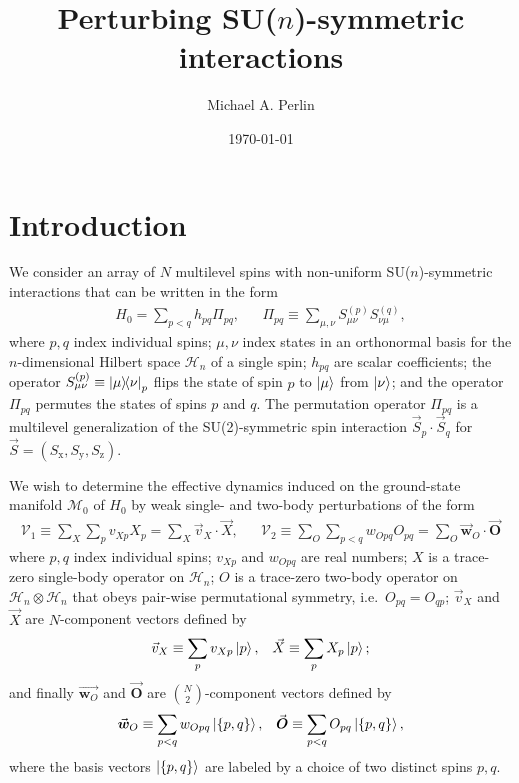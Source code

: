 \documentclass[nofootinbib,notitlepage,11pt]{revtex4-2}
\newcommand{\p}[1]{\left(#1\right)} %
\renewcommand{\set}[1]{\left\{#1\right\}} %
\renewcommand{\c}{\cdot} %
\newcommand{\m}{\bm} %
\renewcommand{\v}{\vec} %
\newcommand{\1}{\mathds{1}}
\newcommand{\x}{\text{x}}
\newcommand{\y}{\text{y}}
\newcommand{\z}{\text{z}}
\renewcommand{\H}{\mathcal{H}}
\newcommand{\M}{\mathcal{M}}
\newcommand{\V}{\mathcal{V}}
\begin{document}
\title{Perturbing SU($n$)-symmetric interactions}%
\author{Michael A. Perlin}%
\date{\today}

\maketitle

\tableofcontents

\section{Introduction}

We consider an array of $N$ multilevel spins with non-uniform
SU($n$)-symmetric interactions that can be written in the form
\begin{align}
  H_0 = \sum_{p<q} h_{pq} \Pi_{pq},
  &&
  \Pi_{pq} \equiv \sum_{\mu,\nu} S_{\mu\nu}^{(p)} S_{\nu\mu}^{(q)},
  \label{eq:ints}
\end{align}
where $p,q$ index individual spins; $\mu,\nu$ index states in an
orthonormal basis for the $n$-dimensional Hilbert space $\H_n$ of a
single spin; $h_{pq}$ are scalar coefficients; the operator
$S_{\mu\nu}^{(p)}\equiv\op{\mu}{\nu}_p$ flips the state of spin $p$ to
$\ket\mu$ from $\ket\nu$; and the operator $\Pi_{pq}$ permutes the
states of spins $p$ and $q$.  The permutation operator $\Pi_{pq}$ is a
multilevel generalization of the SU(2)-symmetric spin interaction
$\v S_p\c\v S_q$ for $\v S=\p{S_\x,S_\y,S_\z}$.

We wish to determine the effective dynamics induced on the
ground-state manifold $\M_0$ of $H_0$ by weak single- and two-body
perturbations of the form
\begin{align}
  \V_1 \equiv \sum_X \sum_p v_{Xp} X_p = \sum_X \v v_X\c\v X,
  &&
  \V_2 \equiv \sum_O \sum_{p<q} w_{Opq} O_{pq}
  = \sum_O \v{\m w}_O\c \v{\m O}
  \label{eq:perturbations}
\end{align}
where $p,q$ index individual spins; $v_{Xp}$ and $w_{Opq}$ are real
numbers; $X$ is a trace-zero single-body operator on $\H_n$; $O$ is a
trace-zero two-body operator on $\H_n\otimes\H_n$ that obeys pair-wise
permutational symmetry, i.e.~$O_{pq}=O_{qp}$; $\v v_X$ and $\v X$ are
$N$-component vectors defined by
\begin{align}
  \v v_X \equiv \sum_p v_{Xp} \ket{p},
  &&
  \v X \equiv \sum_p X_p \ket{p};
\end{align}
and finally $\v{\m w_O}$ and $\v{\m O}$ are ${N \choose 2}$-component
vectors defined by
\begin{align}
  \v{\m w}_O \equiv \sum_{p<q} w_{Opq} \ket{\set{p,q}},
  &&
  \v{\m O} \equiv \sum_{p<q} O_{pq} \ket{\set{p,q}},
\end{align}
where the basis vectors $\ket{\set{p,q}}$ are labeled by a choice of
two distinct spins $p,q$.
\end{document}
